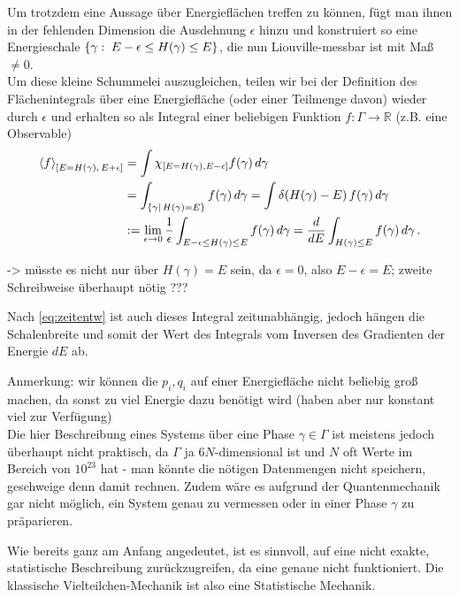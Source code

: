 \documentclass[../class_mech_main.tex]{subfiles}
\begin{document}
Um trotzdem eine Aussage über Energieflächen treffen zu können, fügt man ihnen in der fehlenden Dimension die Ausdehnung $\epsilon$ hinzu und konstruiert so eine Energieschale $\qty{\gamma: \; E-\epsilon \leq H(\gamma) \leq E}$, die nun Liouville-messbar ist mit Maß $\neq 0$.\\
Um diese kleine Schummelei auszugleichen, teilen wir bei der Definition des Flächenintegrals über eine Energiefläche (oder einer Teilmenge davon) wieder durch $\epsilon$ und erhalten so als Integral einer beliebigen Funktion $f: \Gamma \rightarrow \mathbb{R}$ (z.B. eine Observable) 
\begin{align}\label{eq:energy}
\expval{f}_{\qty[E = H(\gamma), \, E + \epsilon]} &= \int \chi_{\qty[E = H(\gamma), E - \epsilon]} f(\gamma) \, d\gamma
\notag\\
&= \int_{\qty{\gamma | \, H(\gamma) = E}} f(\gamma) \, d\gamma = \int \delta(H(\gamma) - E) \, f(\gamma) \, d\gamma
\notag\\
&:= \lim_{\epsilon \rightarrow 0} \frac{1}{\epsilon} \int_{E-\epsilon \leq H(\gamma) \leq E} f(\gamma) \, d\gamma = \dv{E} \int_{H(\gamma) \leq E} f(\gamma) \, d\gamma \, .
\end{align}

-> müsste es nicht nur über $H(\gamma) = E$ sein, da $\epsilon = 0$, also $E - \epsilon = E$; zweite Schreibweise überhaupt nötig ???


Nach \eqref{eq:zeitentw} ist auch dieses Integral zeitunabhängig, jedoch hängen die Schalenbreite und somit der Wert des Integrals vom Inversen des Gradienten der Energie $dE$ ab.

Anmerkung: wir können die $p_i, q_i$ auf einer Energiefläche nicht beliebig groß machen, da sonst zu viel Energie dazu benötigt wird (haben aber nur konstant viel zur Verfügung)\\

Die hier Beschreibung eines Systems über eine Phase $\gamma \in \Gamma$ ist meistens jedoch überhaupt nicht praktisch, da $\Gamma$ ja $6N$-dimensional ist und $N$ oft Werte im Bereich von $10^{23}$ hat - man könnte die nötigen Datenmengen nicht speichern, geschweige denn damit rechnen. Zudem wäre es aufgrund der Quantenmechanik gar nicht möglich, ein System genau zu vermessen oder in einer Phase $\gamma$ zu präparieren.

Wie bereits ganz am Anfang angedeutet, ist es sinnvoll, auf eine nicht exakte, statistische Beschreibung zurückzugreifen, da eine genaue nicht funktioniert. Die klassische Vielteilchen-Mechanik ist also eine Statistische Mechanik.
\end{document}
